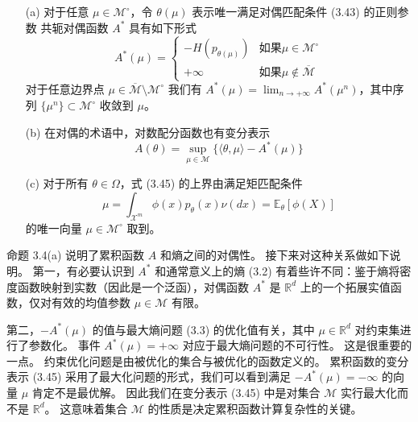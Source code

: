 \begin{tcolorbox}
\begin{prop}

\begin{itemize}
    \item[(a)] 对于任意 $\mu \in \mathcal{M}^\circ$，令 $\theta(\mu)$ 表示唯一满足对偶匹配条件 (3.43) 的正则参数
        共轭对偶函数 $A^*$ 具有如下形式
        \begin{equation}
            A^*(\mu) = \begin{cases}
                -H(p_{\theta(\mu)}) & \text{如果} \mu \in \mathcal{M}^\circ \\
                +\infty & \text{如果} \mu \notin \overline{\mathcal{M}}
            \end{cases}
        \end{equation} 
        对于任意边界点 $\mu \in \overline{\mathcal{M}}\setminus\mathcal{M}^\circ$ 我们有 $A^*(\mu) = \lim_{n \to +\infty}A^*(\mu^n)$，其中序列 $\{\mu^n\} \subset \mathcal{M}^\circ$ 收敛到 $\mu$。
    \item[(b)] 在对偶的术语中，对数配分函数也有变分表示
        \begin{equation}
            A(\theta) = \sup_{\mu \in \mathcal{M}}\{\langle\theta, \mu\rangle - A^*(\mu)\}
        \end{equation}
    \item[(c)] 对于所有 $\theta \in \Omega$，式 (3.45) 的上界由满足矩匹配条件
        \begin{equation}
            \mu = \int_{\mathcal{X}^m}\phi(x)p_{\theta}(x)\nu(dx) = \mathbb{E}_{\theta}[\phi(X)]
        \end{equation}
        的唯一向量 $\mu \in \mathcal{M}^\circ$ 取到。
\end{itemize}

\end{prop}    
\end{tcolorbox}

命题 3.4(a) 说明了累积函数 $A$ 和熵之间的对偶性。
接下来对这种关系做如下说明。
第一，有必要认识到 $A^*$ 和通常意义上的熵 (3.2) 有着些许不同：鉴于熵将密度函数映射到实数（因此是一个泛函），对偶函数 $A^*$ 是 $\mathbb{R}^d$ 上的一个拓展实值函数，仅对有效的均值参数 $\mu \in \mathcal{M}$ 有限。

第二，$-A^*(\mu)$ 的值与最大熵问题 (3.3) 的优化值有关，其中 $\mu \in \mathbb{R}^d$ 对约束集进行了参数化。
事件 $A^*(\mu) = +\infty$ 对应于最大熵问题的不可行性。
这是很重要的一点。
约束优化问题是由被优化的集合与被优化的函数定义的。
累积函数的变分表示 (3.45) 采用了最大化问题的形式，我们可以看到满足 $-A^*(\mu) = -\infty$ 的向量 $\mu$ 肯定不是最优解。
因此我们在变分表示 (3.45) 中是对集合 $\mathcal{M}$ 实行最大化而不是 $\mathbb{R}^d$。
这意味着集合 $\mathcal{M}$ 的性质是决定累积函数计算复杂性的关键。

